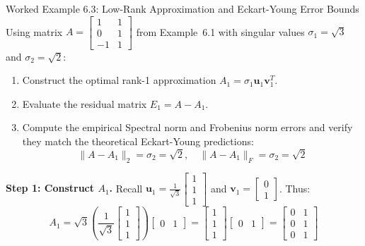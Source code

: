 \begin{examplebox}[breakable]{Worked Example 6.3: Low-Rank Approximation and Eckart-Young Error Bounds}
Using matrix $A = \begin{bmatrix} 1 & 1 \\ 0 & 1 \\ -1 & 1 \end{bmatrix}$ from Example~6.1 with singular values $\sigma_1 = \sqrt{3}$ and $\sigma_2 = \sqrt{2}$:
\begin{enumerate}
    \item Construct the optimal rank-1 approximation $A_1 = \sigma_1 \mathbf{u}_1 \mathbf{v}_1^T$.
    \item Evaluate the residual matrix $E_1 = A - A_1$.
    \item Compute the empirical Spectral norm and Frobenius norm errors and verify they match the theoretical Eckart-Young predictions:
    \begin{equation*}
    \|A - A_1\|_2 = \sigma_2 = \sqrt{2}, \quad \|A - A_1\|_F = \sigma_2 = \sqrt{2}
    \end{equation*}
\end{enumerate}

\textbf{Step 1: Construct $A_1$.}
Recall $\mathbf{u}_1 = \frac{1}{\sqrt{3}}\begin{bmatrix} 1 \\ 1 \\ 1 \end{bmatrix}$ and $\mathbf{v}_1 = \begin{bmatrix} 0 \\ 1 \end{bmatrix}$. Thus:
\begin{equation}
A_1 = \sqrt{3} \left( \frac{1}{\sqrt{3}} \begin{bmatrix} 1 \\ 1 \\ 1 \end{bmatrix} \right) \begin{bmatrix} 0 & 1 \end{bmatrix} = \begin{bmatrix} 1 \\ 1 \\ 1 \end{bmatrix} \begin{bmatrix} 0 & 1 \end{bmatrix} = \begin{bmatrix} 0 & 1 \\ 0 & 1 \\ 0 & 1 \end{bmatrix}
\end{equation}


\end{examplebox}
